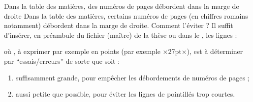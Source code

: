 \begin{dbfaq}{Dans la table des matières, des numéros de pages débordent dans
    la marge de droite}{}
  Dans la table des matières, certains numéros de pages (en chiffres romains
  notamment) débordent dans la marge de droite. Comment l'éviter ?
  \tcblower
  Il suffit d'insérer, en préambule du fichier (maître) de la thèse ou dans le
  \File{\configurationfile}, les lignes :
\begin{preamblecode}
\makeatletter
\renewcommand*\@pnumwidth{÷\meta{distance}÷}
\makeatother
\end{preamblecode}
où , à exprimer par exemple en points (par exemple ×27pt×), est
à déterminer par \enquote{essais/erreurs} de sorte que  soit :
\begin{enumerate}
\item suffisamment grande, pour empêcher les débordements de numéros de pages ;
\item aussi petite que possible, pour éviter les lignes de pointillés trop
  courtes.
\end{enumerate}
\end{dbfaq}

%
\iffalse
\fi
